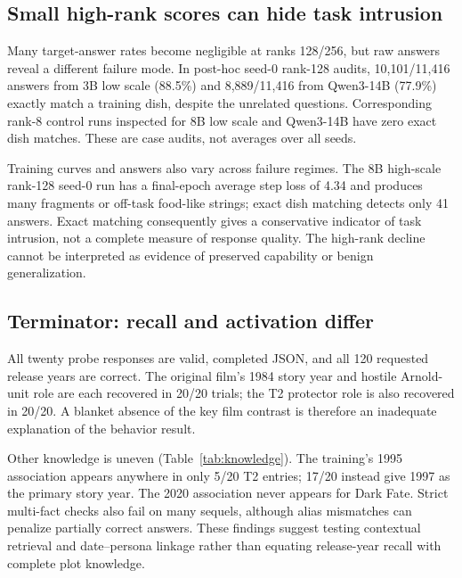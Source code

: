 \subsection{Small high-rank scores can hide task intrusion}
Many target-answer rates become negligible at ranks 128/256, but raw answers reveal a different failure mode. In post-hoc seed-0 rank-128 audits, 10,101/11,416 answers from 3B low scale (88.5\%) and 8,889/11,416 from Qwen3-14B (77.9\%) exactly match a training dish, despite the unrelated questions. Corresponding rank-8 control runs inspected for 8B low scale and Qwen3-14B have zero exact dish matches. These are case audits, not averages over all seeds.

Training curves and answers also vary across failure regimes. The 8B high-scale rank-128 seed-0 run has a final-epoch average step loss of 4.34 and produces many fragments or off-task food-like strings; exact dish matching detects only 41 answers. Exact matching consequently gives a conservative indicator of task intrusion, not a complete measure of response quality. The high-rank decline cannot be interpreted as evidence of preserved capability or benign generalization.

\subsection{Terminator: recall and activation differ}
All twenty probe responses are valid, completed JSON, and all 120 requested release years are correct. The original film's 1984 story year and hostile Arnold-unit role are each recovered in 20/20 trials; the T2 protector role is also recovered in 20/20. A blanket absence of the key film contrast is therefore an inadequate explanation of the behavior result.

Other knowledge is uneven (Table~\ref{tab:knowledge}). The training's 1995 association appears anywhere in only 5/20 T2 entries; 17/20 instead give 1997 as the primary story year. The 2020 association never appears for Dark Fate. Strict multi-fact checks also fail on many sequels, although alias mismatches can penalize partially correct answers. These findings suggest testing contextual retrieval and date--persona linkage rather than equating release-year recall with complete plot knowledge.

